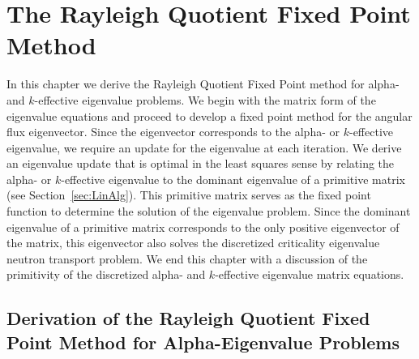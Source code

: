 \chapter{The Rayleigh Quotient Fixed Point Method}
\label{ch3}

In this chapter we derive the Rayleigh Quotient Fixed Point method for alpha- and $k$-effective eigenvalue problems. We begin with the matrix form of the eigenvalue equations and proceed to develop a fixed point method for the angular flux eigenvector. Since the eigenvector corresponds to the alpha- or $k$-effective eigenvalue, we require an update for the eigenvalue at each iteration. We derive an eigenvalue update that is optimal in the least squares sense by relating the alpha- or $k$-effective eigenvalue to the dominant eigenvalue of a primitive matrix (see Section~\ref{sec:LinAlg}). This primitive matrix serves as the fixed point function to determine the solution of the eigenvalue problem. Since the dominant eigenvalue of a primitive matrix corresponds to the only positive eigenvector of the matrix, this eigenvector also solves the discretized criticality eigenvalue neutron transport problem. We end this chapter with a discussion of the primitivity of the discretized alpha- and $k$-effective eigenvalue matrix equations.

\section{Derivation of the Rayleigh Quotient Fixed Point \newline Method for Alpha-Eigenvalue Problems}

